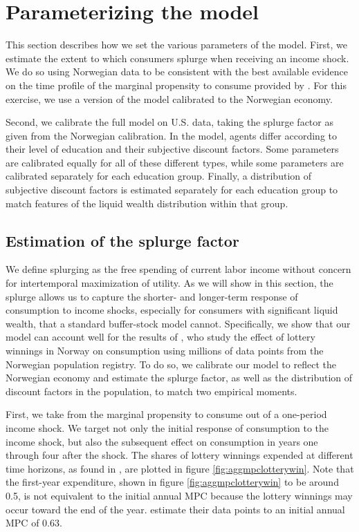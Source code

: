 \documentclass[../HAFiscal]{subfiles}
\begin{document}
\section{Parameterizing the model}

This section describes how we set the various parameters of the model. First, we estimate the extent to which consumers splurge when receiving an income shock. We do so using Norwegian data to be consistent with the best available evidence on the time profile of the marginal propensity to consume provided by \citet{fagereng_mpc_2021}. For this exercise, we use a version of the model calibrated to the Norwegian economy. 

Second, we calibrate the full model on U.S. data, taking the splurge factor as given from the Norwegian calibration. In the model, agents differ according to their level of education and their subjective discount factors. Some parameters are calibrated equally for all of these different types, while some parameters are calibrated separately for each education group. Finally, a distribution of subjective discount factors is estimated separately for each education group to match features of the liquid wealth distribution within that group. 

\subsection{Estimation of the splurge factor}
\label{sec:splurge}

We define splurging as the free spending of current labor income without concern for intertemporal maximization of utility. As we will show in this section, the splurge allows us to capture the shorter- and longer-term response of consumption to income shocks, especially for consumers with significant liquid wealth, that a standard buffer-stock model cannot. Specifically, we show that our model can account well for the results of \citet{fagereng_mpc_2021}, who study the effect of lottery winnings in Norway on consumption using millions of data points from the Norwegian population registry. To do so, we calibrate our model to reflect the Norwegian economy and estimate the splurge factor, as well as the distribution of discount factors in the population, to match two empirical moments. 

First, we take from \citet{fagereng_mpc_2021} the marginal propensity to consume out of a one-period income shock. We target not only the initial response of consumption to the income shock, but also the subsequent effect on consumption in years one through four after the shock. The shares of lottery winnings expended at different time horizons, as found in \citet{fagereng_mpc_2021}, are plotted in figure \ref{fig:aggmpclotterywin}. Note that the first-year expenditure, shown in figure \ref{fig:aggmpclotterywin} to be around 0.5, is not equivalent to the initial annual MPC because the lottery winnings may occur toward the end of the year. \citet{fagereng_mpc_2021} estimate their data points to an initial annual MPC of 0.63.
\end{document}
